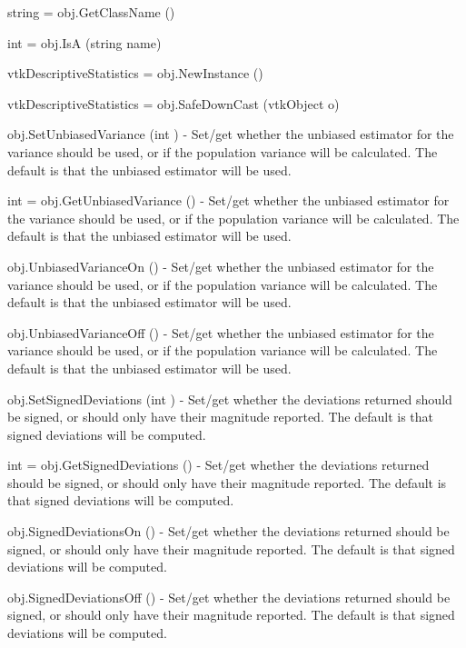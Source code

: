 \begin{DoxyItemize}
\item {\ttfamily string = obj.\-Get\-Class\-Name ()}  
\item {\ttfamily int = obj.\-Is\-A (string name)}  
\item {\ttfamily vtk\-Descriptive\-Statistics = obj.\-New\-Instance ()}  
\item {\ttfamily vtk\-Descriptive\-Statistics = obj.\-Safe\-Down\-Cast (vtk\-Object o)}  
\item {\ttfamily obj.\-Set\-Unbiased\-Variance (int )} -\/ Set/get whether the unbiased estimator for the variance should be used, or if the population variance will be calculated. The default is that the unbiased estimator will be used.  
\item {\ttfamily int = obj.\-Get\-Unbiased\-Variance ()} -\/ Set/get whether the unbiased estimator for the variance should be used, or if the population variance will be calculated. The default is that the unbiased estimator will be used.  
\item {\ttfamily obj.\-Unbiased\-Variance\-On ()} -\/ Set/get whether the unbiased estimator for the variance should be used, or if the population variance will be calculated. The default is that the unbiased estimator will be used.  
\item {\ttfamily obj.\-Unbiased\-Variance\-Off ()} -\/ Set/get whether the unbiased estimator for the variance should be used, or if the population variance will be calculated. The default is that the unbiased estimator will be used.  
\item {\ttfamily obj.\-Set\-Signed\-Deviations (int )} -\/ Set/get whether the deviations returned should be signed, or should only have their magnitude reported. The default is that signed deviations will be computed.  
\item {\ttfamily int = obj.\-Get\-Signed\-Deviations ()} -\/ Set/get whether the deviations returned should be signed, or should only have their magnitude reported. The default is that signed deviations will be computed.  
\item {\ttfamily obj.\-Signed\-Deviations\-On ()} -\/ Set/get whether the deviations returned should be signed, or should only have their magnitude reported. The default is that signed deviations will be computed.  
\item {\ttfamily obj.\-Signed\-Deviations\-Off ()} -\/ Set/get whether the deviations returned should be signed, or should only have their magnitude reported. The default is that signed deviations will be computed.  

\end{DoxyItemize}
